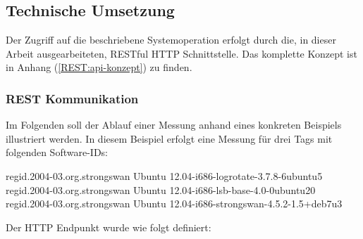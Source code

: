 \subsection{Technische Umsetzung}
Der Zugriff auf die beschriebene Systemoperation erfolgt durch die, in dieser
Arbeit ausgearbeiteten, RESTful HTTP Schnittstelle. Das komplette Konzept ist in
Anhang (\autoref{REST:api-konzept}) zu finden.

\subsubsection{REST Kommunikation}
Im Folgenden soll der Ablauf einer Messung anhand eines konkreten Beispiels
illustriert werden. In diesem Beispiel erfolgt eine Messung für drei Tags mit
folgenden Software-IDs:

\begin{textcode}
regid.2004-03.org.strongswan Ubuntu 12.04-i686-logrotate-3.7.8-6ubuntu5
regid.2004-03.org.strongswan Ubuntu 12.04-i686-lsb-base-4.0-0ubuntu20
regid.2004-03.org.strongswan Ubuntu 12.04-i686-strongswan-4.5.2-1.5+deb7u3
\end{textcode}

Der HTTP Endpunkt wurde wie folgt definiert:

